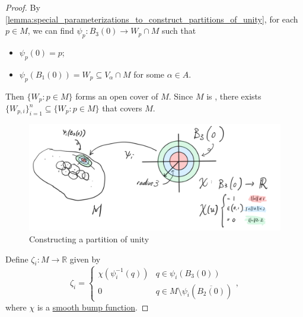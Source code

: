 \documentclass[notoc,notitlepage]{tufte-book}
\begin{document}
\begin{proof}
  By \cref{lemma:special_parameterizations_to_construct_partitions_of_unity},
  for each $p \in M$, we can find $\psi_p : B_3(0) \to W_p \cap M$ such
  that
  \begin{itemize}
    \item $\psi_p(0) = p$;
    \item $\psi_p(B_1(0)) = W_p \subseteq V_{\alpha} \cap M$ for some $\alpha
      \in A$. 
  \end{itemize}
  Then $\{ W_p : p \in M \}$ forms an open cover of $M$. Since $M$ is
  , there exists $\{ W_{p, i} \}_{i=1}^{n} \subseteq \{ W_p : p
  \in M \}$ that covers $M$. 
  \begin{figure}[ht]
    \centering
    \includegraphics[width=\linewidth]{images/constructing-partition-of-unity.png}
    \caption{Constructing a partition of unity}
    \label{fig:constructing_a_partition_of_unity}
  \end{figure}

  Define $\zeta_i : M \to \mathbb{R}$ given by
  \begin{equation*}
    \zeta_i = \begin{cases}
      \chi(\psi_i^{-1}(q)) & q \in \psi_i(B_3(0)) \\
      0          & q \in M \setminus \psi_i(\overline{B_2(0)})
    \end{cases},
  \end{equation*}
  where $\chi$ is a \hyperref[lemma:smooth_bump_functions]{smooth bump
  function}. 
  

\end{proof}
\end{document}

